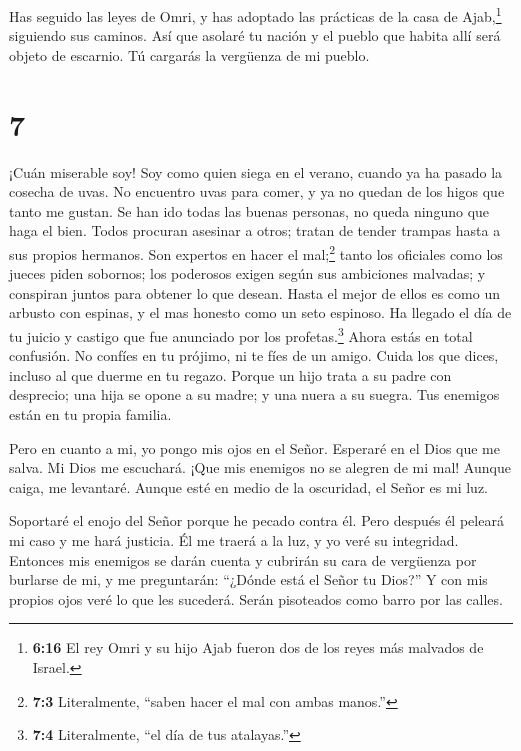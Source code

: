  Has seguido las leyes de Omri, y has adoptado las
prácticas de la casa de Ajab,\footnote{\textbf{6:16} El rey Omri y su
  hijo Ajab fueron dos de los reyes más malvados de Israel.} siguiendo
sus caminos. Así que asolaré tu nación y el pueblo que habita allí será
objeto de escarnio. Tú cargarás la vergüenza de mi pueblo.

\hypertarget{section-6}{%
\section{7}\label{section-6}}

 ¡Cuán miserable soy! Soy como quien siega en el verano,
cuando ya ha pasado la cosecha de uvas. No encuentro uvas para comer, y
ya no quedan de los higos que tanto me gustan.  Se han ido
todas las buenas personas, no queda ninguno que haga el bien. Todos
procuran asesinar a otros; tratan de tender trampas hasta a sus propios
hermanos.  Son expertos en hacer el mal;\footnote{\textbf{7:3}
  Literalmente, ``saben hacer el mal con ambas manos.''} tanto los
oficiales como los jueces piden sobornos; los poderosos exigen según sus
ambiciones malvadas; y conspiran juntos para obtener lo que desean.
 Hasta el mejor de ellos es como un arbusto con espinas, y
el mas honesto como un seto espinoso. Ha llegado el día de tu juicio y
castigo que fue anunciado por los profetas.\footnote{\textbf{7:4}
  Literalmente, ``el día de tus atalayas.''} Ahora estás en total
confusión.  No confíes en tu prójimo, ni te fíes de un
amigo. Cuida los que dices, incluso al que duerme en tu regazo.
 Porque un hijo trata a su padre con desprecio; una hija se
opone a su madre; y una nuera a su suegra. Tus enemigos están en tu
propia familia.

 Pero en cuanto a mi, yo pongo mis ojos en el Señor.
Esperaré en el Dios que me salva. Mi Dios me escuchará. 
¡Que mis enemigos no se alegren de mi mal! Aunque caiga, me levantaré.
Aunque esté en medio de la oscuridad, el Señor es mi luz.

 Soportaré el enojo del Señor porque he pecado contra él.
Pero después él peleará mi caso y me hará justicia. Él me traerá a la
luz, y yo veré su integridad.  Entonces mis enemigos se
darán cuenta y cubrirán su cara de vergüenza por burlarse de mi, y me
preguntarán: ``¿Dónde está el Señor tu Dios?'' Y con mis propios ojos
veré lo que les sucederá. Serán pisoteados como barro por las calles.

